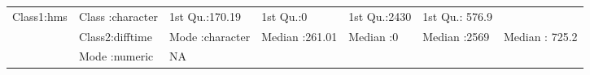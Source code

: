 \documentclass[]{article}
\begin{document}
\begin{longtable}[]{@{}lllllll@{}}
\begin{minipage}[t]{0.14\columnwidth}
Class1:hms\strut
\end{minipage} & \begin{minipage}[t]{0.15\columnwidth}\raggedright\strut
Class :character\strut
\end{minipage} & \begin{minipage}[t]{0.13\columnwidth}\raggedright\strut
1st Qu.:170.19\strut
\end{minipage} & \begin{minipage}[t]{0.10\columnwidth}\raggedright\strut
1st Qu.:0\strut
\end{minipage} & \begin{minipage}[t]{0.12\columnwidth}\raggedright\strut
1st Qu.:2430\strut
\end{minipage} & \begin{minipage}[t]{0.13\columnwidth}\raggedright\strut
1st Qu.: 576.9\strut
\end{minipage}\tabularnewline
\begin{minipage}[t]{0.03\columnwidth}\raggedright\strut
\strut
\end{minipage} & \begin{minipage}[t]{0.14\columnwidth}\raggedright\strut
Class2:difftime\strut
\end{minipage} & \begin{minipage}[t]{0.15\columnwidth}\raggedright\strut
Mode :character\strut
\end{minipage} & \begin{minipage}[t]{0.13\columnwidth}\raggedright\strut
Median :261.01\strut
\end{minipage} & \begin{minipage}[t]{0.10\columnwidth}\raggedright\strut
Median :0\strut
\end{minipage} & \begin{minipage}[t]{0.12\columnwidth}\raggedright\strut
Median :2569\strut
\end{minipage} & \begin{minipage}[t]{0.13\columnwidth}\raggedright\strut
Median : 725.2\strut
\end{minipage}\tabularnewline
\begin{minipage}[t]{0.03\columnwidth}\raggedright\strut
\strut
\end{minipage} & \begin{minipage}[t]{0.14\columnwidth}\raggedright\strut
Mode :numeric\strut
\end{minipage} & \begin{minipage}[t]{0.15\columnwidth}\raggedright\strut
NA\strut

\end{minipage}
\end{longtable}
\end{document}

